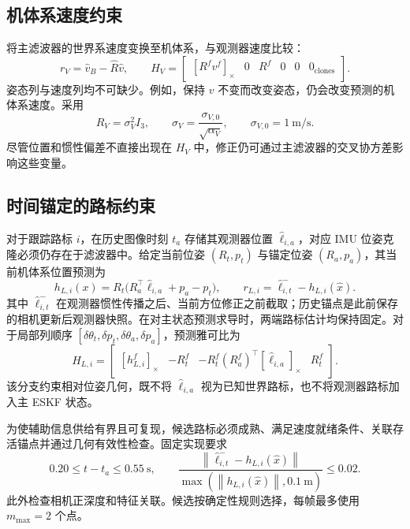 \documentclass[a4paper,runningheads]{llncs}
\newcommand{\sk}[1]{[#1]_{\times}}
\newcommand{\norm}[1]{\left\lVert #1\right\rVert}
\begin{document}
\subsection{机体系速度约束}
将主滤波器的世界系速度变换至机体系，与观测器速度比较：
\begin{equation}
 r_V=\hat v_B-\hat R\hat v,\qquad
 H_V=\begin{bmatrix}
 \sk{R^fv^f}&0&R^f&0&0&0_{\mathrm{clones}}
 \end{bmatrix}.
 \label{eq:velocity}
\end{equation}
姿态列与速度列均不可缺少。例如，保持 $v$ 不变而改变姿态，仍会改变预测的机体系速度。采用
\begin{equation}
 R_V=\sigma_V^2I_3,\qquad
 \sigma_V=\frac{\sigma_{V,0}}{\sqrt{\alpha_V}},\qquad
 \sigma_{V,0}=1~\mathrm{m/s}.
 \label{eq:vnoise}
\end{equation}
尽管位置和惯性偏差不直接出现在 $H_V$ 中，修正仍可通过主滤波器的交叉协方差影响这些变量。

\subsection{时间锚定的路标约束}
对于跟踪路标 $i$，在历史图像时刻 $t_a$ 存储其观测器位置 $\hat\ell_{i,a}$，对应 IMU 位姿克隆必须仍存在于滤波器中。给定当前位姿 $(R_t,p_t)$ 与锚定位姿 $(R_a,p_a)$，其当前机体系位置预测为
\begin{equation}
 h_{L,i}(x)=R_t\big(R_a^\top\hat\ell_{i,a}+p_a-p_t\big),\qquad
 r_{L,i}=\hat\ell_{i,t}^{-}-h_{L,i}(\hat x).
 \label{eq:landmark}
\end{equation}
其中 $\hat\ell_{i,t}^{-}$ 在观测器惯性传播之后、当前方位修正之前截取；历史锚点是此前保存的相机更新后观测器快照。在对主状态预测求导时，两端路标估计均保持固定。对于局部列顺序 $[\delta\theta_t,\delta p_t,\delta\theta_a,\delta p_a]$，预测雅可比为
\begin{equation}
 H_{L,i}=
 \begin{bmatrix}
 \sk{h_{L,i}^f}&-R_t^f&
 -R_t^f(R_a^f)^\top\sk{\hat\ell_{i,a}}&R_t^f
 \end{bmatrix}.
 \label{eq:landmarkH}
\end{equation}
该分支约束相对位姿几何，既不将 $\hat\ell_{i,a}$ 视为已知世界路标，也不将观测器路标加入主 ESKF 状态。

为使辅助信息供给有界且可复现，候选路标必须成熟、满足速度就绪条件、关联存活锚点并通过几何有效性检查。固定实现要求
\begin{equation}
 0.20\leq t-t_a\leq0.55~\mathrm{s},\qquad
 \frac{\norm{\hat\ell_{i,t}^{-}-h_{L,i}(\hat x)}}
 {\max(\norm{h_{L,i}(\hat x)},0.1~\mathrm{m})}\leq0.02 .
 \label{eq:lvalid}
\end{equation}
此外检查相机正深度和特征关联。候选按确定性规则选择，每帧最多使用 $m_{\max}=2$ 个点。
\end{document}
